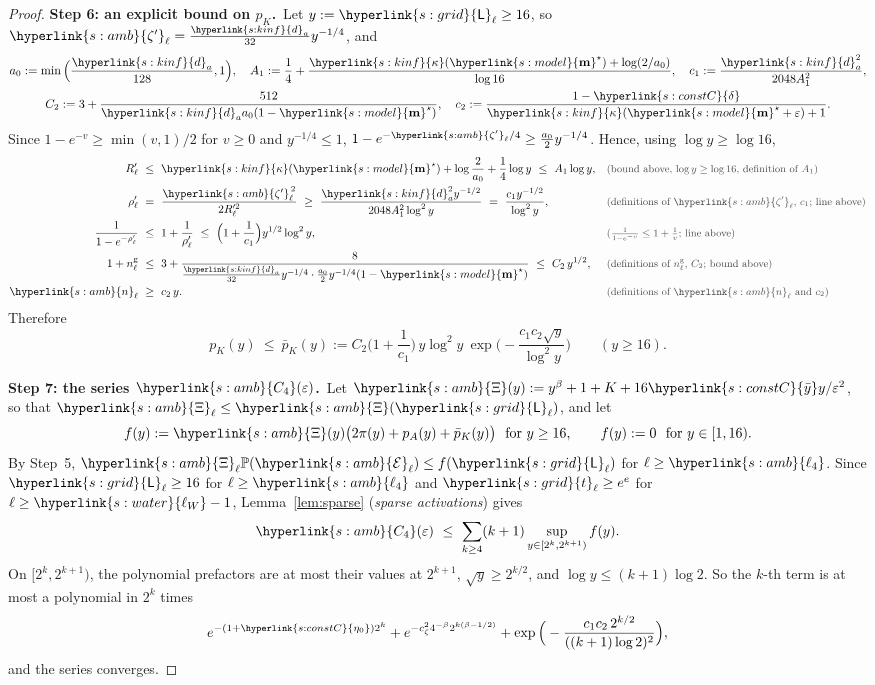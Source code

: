 \documentclass[10pt]{article}
\newcommand{\sy}[2]{{\hyperlink{#1}{#2}}}
\newcommand{\PP}{\mathbb{P}}
\newcommand{\1}{\mathbf{1}}
\newcommand{\m}{\sy{s:model}{\mathbf{m}}}
\newcommand{\kap}{\sy{s:kinf}{\kappa}}
\newcommand{\da}{\sy{s:kinf}{d}_a}
\newcommand{\tl}{\sy{s:grid}{t}}
\newcommand{\Lg}{\sy{s:grid}{\mathsf L}}
\newcommand{\ezz}{\sy{s:constC}{\eta_0}}
\newcommand{\dl}{\sy{s:constC}{\delta}}
\newcommand{\yb}{\sy{s:constC}{\bar y}}
\newcommand{\lW}{\sy{s:water}{\ell_W}}
\newcommand{\Eamb}{\sy{s:amb}{\mathcal E}}
\newcommand{\lfour}{\sy{s:amb}{\ell_4}}
\newcommand{\zetp}{\sy{s:amb}{\zeta'}}
\newcommand{\nl}{\sy{s:amb}{n}}
\newcommand{\cell}{\sy{s:amb}{\Xi}}
\newcommand{\Cfour}{\sy{s:amb}{C_4}}
\newcommand{\stp}[2]{\par\medskip\noindent\textbf{Step #1: #2.}\ }
\newcommand{\why}[1]{\text{\small\color{black!70}(#1)}}
\begin{document}
\begin{proof}
\stp6{an explicit bound on $p_K$}Let $y:=\Lg_\ell\ge16$, so $\zetp_\ell=\frac{\da}{32}y^{-1/4}$, and
\begin{gather*}
a_0:=\min\Big(\frac{\da}{128},1\Big),\quad A_1:=\frac14+\frac{\kap(\m^\star)+\log(2/a_0)}{\log16},\quad c_1:=\frac{\da^2}{2048A_1^2},\\
C_2:=3+\frac{512}{\da a_0(1-\m^\star)},\quad c_2:=\frac{1-\dl}{\kap(\m^\star+\varepsilon)+1}.
\end{gather*}
Since $1-e^{-v}\ge\min(v,1)/2$ for $v\ge0$ and $y^{-1/4}\le1$, $1-e^{-\zetp_\ell/4}\ge\frac{a_0}2y^{-1/4}$. Hence, using $\log y\ge\log16$,
\begin{align*}
R'_\ell\ &\le\ \kap(\m^\star)+\log\frac2{a_0}+\frac14\log y\ \le\ A_1\log y,&&\why{bound above, $\log y\ge\log16$, definition of $A_1$}\\
\rho'_\ell\ &=\ \frac{\zetp_\ell^{\,2}}{2R_\ell'^2}\ \ge\ \frac{\da^2y^{-1/2}}{2048A_1^2\log^2y}\ =\ \frac{c_1y^{-1/2}}{\log^2y},&&\why{definitions of $\zetp_\ell$, $c_1$; line above}\\
\frac1{1-e^{-\rho'_\ell}}\ &\le\ 1+\frac1{\rho'_\ell}\ \le\ \Big(1+\frac1{c_1}\Big)y^{1/2}\log^2y,&&\why{$\tfrac1{1-e^{-v}}\le1+\tfrac1v$; line above}\\
1+n^{\mathrm g}_\ell\ &\le\ 3+\frac8{\frac{\da}{32}y^{-1/4}\cdot\frac{a_0}2y^{-1/4}(1-\m^\star)}\ \le\ C_2\,y^{1/2},&&\why{definitions of $n^{\mathrm g}_\ell$, $C_2$; bound above}\\
\nl_\ell\ &\ge\ c_2\,y .&&\why{definitions of $\nl_\ell$ and $c_2$}
\end{align*}
Therefore
\[
p_K(y)\ \le\ \bar p_K(y):=C_2\Big(1+\frac1{c_1}\Big)\,y\log^2y\ \exp\Big(-\frac{c_1c_2\sqrt y}{\log^2y}\Big)\qquad(y\ge16).
\]

\stp7{the series $\Cfour(\varepsilon)$}Let $\cell(y):=y^\beta+1+K+16\yb y/\varepsilon^2$, so that $\cell_\ell\le\cell(\Lg_\ell)$, and let
\[
f(y):=\cell(y)\big(2\pi(y)+p_A(y)+\bar p_K(y)\big)\ \text{ for }y\ge16,\qquad f(y):=0\ \text{ for }y\in[1,16).
\]
By Step~5, $\cell_\ell\PP(\Eamb_\ell)\le f(\Lg_\ell)$ for $\ell\ge\lfour$. Since $\Lg_\ell\ge16$ for $\ell\ge\lfour$ and $\tl_\ell\ge e^e$ for $\ell\ge\lW-1$, Lemma~\ref{lem:sparse} (\emph{sparse activations}) gives
\[
\Cfour(\varepsilon)\ \le\ \sum_{k\ge4}(k+1)\sup_{y\in[2^k,2^{k+1})}f(y).
\]
On $[2^k,2^{k+1})$, the polynomial prefactors are at most their values at $2^{k+1}$, $\sqrt y\ge2^{k/2}$, and $\log y\le(k+1)\log2$. So the $k$-th term is at most a polynomial
in $2^k$ times
\[
e^{-(1+\ezz)2^k}+e^{-c_\zeta^24^{-\beta}2^{k(\beta-1/2)}}+\exp\Big(-\frac{c_1c_2\,2^{k/2}}{((k+1)\log2)^2}\Big),
\]
and the series converges.
\end{proof}
\end{document}
